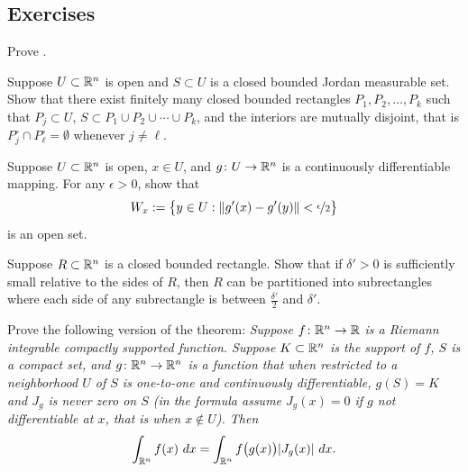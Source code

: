 \subsection{Exercises}

\begin{exercise}
Prove .
\end{exercise}

\begin{exercise} \label{mv:changeofvarcoverbyrects}
Suppose $U \subset {\mathbb{R}}^n$ is open
and $S \subset U$ is a closed bounded Jordan measurable set.
Show that there exist finitely many closed bounded rectangles
$P_1,P_2, \ldots, P_k$ such that $P_j \subset U$,
$S \subset P_1 \cup P_2 \cup \cdots \cup P_k$, and
the interiors are mutually disjoint, that is
$P_j^\circ \cap P^\circ_\ell = \emptyset$ whenever $j \not= \ell$.
\end{exercise}

\begin{exercise} \label{mv:changeofvarWxopen}
Suppose $U \subset {\mathbb{R}}^n$ is open, $x \in U$,
and $g \colon U \to {\mathbb{R}}^n$ is a continuously differentiable mapping.
For any $\epsilon > 0$, show that
\begin{equation*}
W_x := \bigl\{ y \in U : \lVert {g'(x)-g'(y)} \rVert < \nicefrac{\epsilon}{2} \bigr\}
\end{equation*}
is an open set.
\end{exercise}

\begin{exercise} \label{mv:changeofvarrectside}
Suppose $R \subset {\mathbb{R}}^n$ is a closed bounded rectangle.
Show that if $\delta' > 0$ is sufficiently small relative
to the sides of $R$, then $R$ can be partitioned
into subrectangles where each side of any subrectangle
is between $\frac{\delta'}{2}$ and $\delta'$.
\end{exercise}

\begin{exercise}
Prove the following version of the theorem:
\emph{Suppose $f \colon {\mathbb{R}}^n \to {\mathbb{R}}$ is a Riemann integrable
compactly supported function.  Suppose $K \subset {\mathbb{R}}^n$
is the support of $f$, $S$ is a compact set,
and $g \colon {\mathbb{R}}^n \to {\mathbb{R}}^n$ is
a function that when restricted to a neighborhood $U$ of
$S$ is one-to-one and continuously differentiable,
$g(S) = K$ and $J_g$ is never zero on $S$ (in the formula 
assume $J_g(x) = 0$ if $g$ not differentiable at $x$, that is when $x \notin
U$).  Then}
\begin{equation*}
\int_{{\mathbb{R}}^{n}} f(x) ~ dx = 
\int_{{\mathbb{R}}^n} f\bigl(g(x)\bigr) \lvert {J_g(x)} \rvert ~ dx .
\end{equation*}
\end{exercise}

